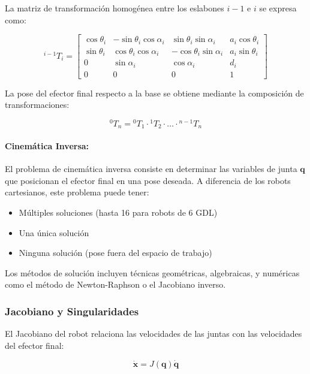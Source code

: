 La matriz de transformación homogénea entre los eslabones $i-1$ e $i$ se expresa como:

\begin{equation}
{}^{i-1}T_i = 
\begin{bmatrix}
\cos\theta_i & -\sin\theta_i\cos\alpha_i & \sin\theta_i\sin\alpha_i & a_i\cos\theta_i \\
\sin\theta_i & \cos\theta_i\cos\alpha_i & -\cos\theta_i\sin\alpha_i & a_i\sin\theta_i \\
0 & \sin\alpha_i & \cos\alpha_i & d_i \\
0 & 0 & 0 & 1
\end{bmatrix}
\end{equation}

La pose del efector final respecto a la base se obtiene mediante la composición de transformaciones:

\begin{equation}
{}^0T_n = {}^0T_1 \cdot {}^1T_2 \cdot \ldots \cdot {}^{n-1}T_n
\end{equation}

\paragraph{Cinemática Inversa:}

El problema de cinemática inversa consiste en determinar las variables de junta $\mathbf{q}$ que posicionan el efector final en una pose deseada. A diferencia de los robots cartesianos, este problema puede tener:

\begin{itemize}
    \item Múltiples soluciones (hasta 16 para robots de 6 GDL)
    \item Una única solución
    \item Ninguna solución (pose fuera del espacio de trabajo)
\end{itemize}

Los métodos de solución incluyen técnicas geométricas, algebraicas, y numéricas como el método de Newton-Raphson o el Jacobiano inverso.

\subsubsection{Jacobiano y Singularidades}

El Jacobiano del robot relaciona las velocidades de las juntas con las velocidades del efector final:

\begin{equation}
\dot{\mathbf{x}} = J(\mathbf{q}) \dot{\mathbf{q}}
\end{equation}

